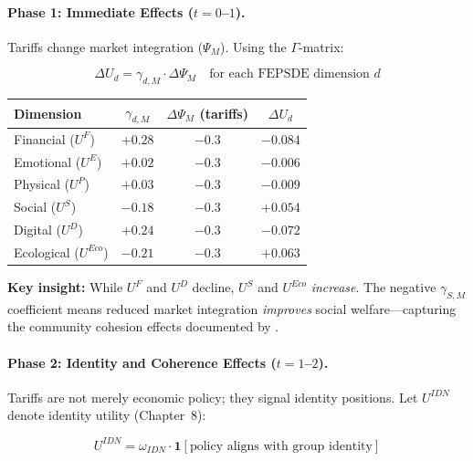\paragraph{Phase 1: Immediate Effects ($t = 0$--$1$).}

Tariffs change market integration ($\Psi_M$). Using the $\Gamma$-matrix:

\begin{equation}
\Delta U_d = \gamma_{d,M} \cdot \Delta \Psi_M \quad \text{for each FEPSDE dimension } d
\end{equation}

\begin{center}
\renewcommand{\arraystretch}{1.3}
\begin{tabular}{lccc}
\hline
\textbf{Dimension} & $\gamma_{d,M}$ & $\Delta \Psi_M$ (tariffs) & $\Delta U_d$ \\
\hline
Financial ($U^F$) & $+0.28$ & $-0.3$ & $-0.084$ \\
Emotional ($U^E$) & $+0.02$ & $-0.3$ & $-0.006$ \\
Physical ($U^P$) & $+0.03$ & $-0.3$ & $-0.009$ \\
Social ($U^S$) & $-0.18$ & $-0.3$ & $\mathbf{+0.054}$ \\
Digital ($U^D$) & $+0.24$ & $-0.3$ & $-0.072$ \\
Ecological ($U^{Eco}$) & $-0.21$ & $-0.3$ & $\mathbf{+0.063}$ \\
\hline
\end{tabular}
\end{center}

\textbf{Key insight:} While $U^F$ and $U^D$ decline, $U^S$ and $U^{Eco}$ \emph{increase}.
The negative $\gamma_{S,M}$ coefficient means reduced market integration 
\emph{improves} social welfare---capturing the community cohesion effects 
documented by \citet{autor2013china}.

\paragraph{Phase 2: Identity and Coherence Effects ($t = 1$--$2$).}

Tariffs are not merely economic policy; they signal identity positions.
Let $U^{IDN}$ denote identity utility (Chapter~8):

\begin{equation}
U^{IDN} = \omega_{IDN} \cdot \mathbf{1}[\text{policy aligns with group identity}]
\end{equation}

